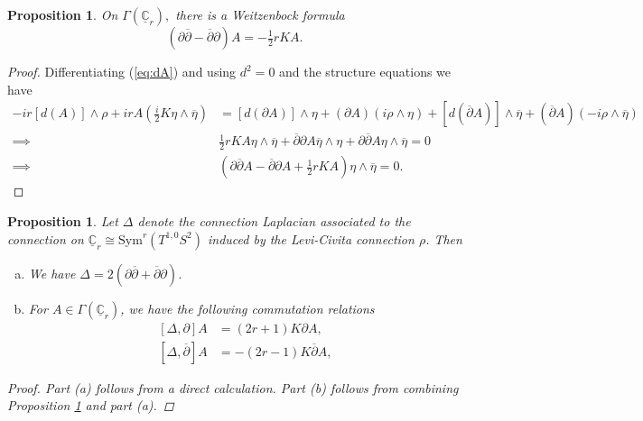\documentclass[11pt]{article}
\newcommand{\Sym}{\mathrm{Sym}}
\newcommand{\uC}{\underline{\mathbb{C}}}
\newtheorem{prop}[thm]{Proposition}
\theoremstyle{definition}
\numberwithin{equation}{section}
\begin{document}
\begin{prop}\label{prop:weitzenbock}
    On $\Gamma(\uC_r),$ there is a Weitzenbock formula
    \begin{equation*}
        \left( \partial \overline{\partial} - \overline{\partial} \partial \right) A = -\tfrac{1}{2} r K A.
    \end{equation*}
\end{prop}
\begin{proof}
    Differentiating (\ref{eq:dA}) and using $d^2 = 0$ and the structure equations we have
    \begin{equation*}
        \begin{aligned}
            - i r \left[ d(A) \right ] \wedge \rho + i r A \left( \tfrac{i}{2} K \eta \wedge \overline{\eta} \right) &= \left[ d \left( \partial A \right) \right] \wedge \eta + \left( \partial A \right) \left( i \rho \wedge \eta \right) + \left[ d \left( \overline{\partial} A \right) \right] \wedge \overline{\eta} + \left( \overline{\partial} A \right) \left( -i \rho \wedge \overline{\eta} \right) \\
           \implies &  \tfrac{1}{2} r K A \eta \wedge \overline{\eta} + \overline{\partial} \partial A \overline{\eta} \wedge \eta + \partial \overline{\partial} A \eta \wedge \overline{\eta} = 0 \\
           \implies & \left( \partial \overline{\partial} A - \overline{\partial} \partial A + \tfrac{1}{2} r K A \right) \eta \wedge \overline{\eta} = 0.
        \end{aligned}
    \end{equation*}
\end{proof}

\begin{prop}\label{prop:CrLaplacian}
    Let $\Delta$ denote the connection Laplacian associated to the connection on $\uC_r \cong \Sym^r(T^{1,0}S^2)$ induced by the Levi-Civita connection $\rho$. Then
\begin{enumerate}[(a)]
\item We have $\Delta = 2 \left( \partial \overline{\partial} + \overline{\partial} \partial \right)$.
\item For $A \in \Gamma(\uC_r)$, we have the following commutation relations
    \begin{equation*}
        \begin{aligned}
            \left[ \Delta, \partial \right] A &= \left( 2r + 1 \right) K \partial A, \\
            \left[ \Delta, \overline{\partial} \right] A &= -\left( 2 r - 1 \right) K \overline{\partial} A,
        \end{aligned}
    \end{equation*}
\end{enumerate}    

    \begin{proof} Part (a) follows from a direct calculation.  Part (b) follows from combining Proposition \ref{prop:weitzenbock} and part (a).
    \end{proof}
\end{prop}
\end{document}
